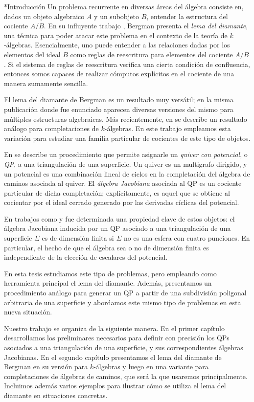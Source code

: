 \begin{chapter}*{Introducción}
Un problema recurrente en diversas áreas del álgebra consiste en, dados un objeto algebraico $A$ y un subobjeto $B$, entender la estructura del cociente $A/B$. En su influyente trabajo \cite{Ber78}, Bergman presenta el \emph{lema del diamante}, una técnica para poder atacar este problema en el contexto de la teoría de $k$-álgebras. Esencialmente, uno puede entender a las relaciones dadas por los elementos del ideal $B$ como reglas de reescritura para elementos del cociente $A/B$. Si el sistema de reglas de reescritura verifica una cierta condición de confluencia, entonces somos capaces de realizar cómputos explícitos en el cociente de una manera sumamente sencilla.

El lema del diamante de Bergman es un resultado muy versátil; en la misma publicación donde fue enunciado aparecen diversas versiones del mismo para múltiples estructuras algebraicas. Más recientemente, en \cite{SAV15} se describe un resultado análogo para completaciones de $k$-álgebras. En este trabajo empleamos esta variación para estudiar una familia particular de cocientes de este tipo de objetos.

En \cite{DWZ08} se describe un procedimiento que permite asignarle un \emph{quiver con potencial}, o \emph{QP}, a una triangulación de una superficie. Un quiver es un multigrafo dirigido, y un potencial es una combinación lineal de ciclos en la completación del álgebra de caminos asociada al quiver. El \emph{álgebra Jacobiana} asociada al QP es un cociente particular de dicha completación; explícitamente, es aquel que se obtiene al cocientar por el ideal cerrado generado por las derivadas cíclicas del potencial.

En trabajos como \cite{Lad12} y \cite{TVD12} fue determinada una propiedad clave de estos objetos: el álgebra Jacobiana inducida por un QP asociado a una triangulación de una superficie $\Sigma$ es de dimensión finita si $\Sigma$ no es una esfera con cuatro punciones. En particular, el hecho de que el álgebra sea o no de dimensión finita es independiente de la elección de escalares del potencial.

En esta tesis estudiamos este tipo de problemas, pero empleando como herramienta principal el lema del diamante. Además, presentamos un procedimiento análogo para generar un QP a partir de una subdivisión poligonal arbitraria de una superficie y abordamos este mismo tipo de problemas en esta nueva situación.

Nuestro trabajo se organiza de la siguiente manera. En el primer capítulo desarrollamos los preliminares necesarios para definir con precisión los QPs asociados a una triangulación de una superficie, y sus correspondientes álgebras Jacobianas. En el segundo capítulo presentamos el lema del diamante de Bergman en su versión para $k$-álgebras y luego en una variante para completaciones de álgebras de caminos, que será la que usaremos principalmente. Incluimos además varios ejemplos para ilustrar cómo se utiliza el lema del diamante en situaciones concretas.


\end{chapter}
